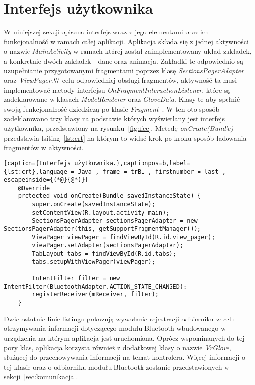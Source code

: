 \section{Interfejs użytkownika}
\label{sec:interface}
W niniejszej sekcji opisano interfejs wraz z jego elementami oraz ich funkcjonalność w ramach całej aplikacji. Aplikacja składa się z jednej aktywności o nazwie \textit{MainActivity} w ramach której został zaimplementowany układ zakładek, a konkretnie dwóch zakładek - dane oraz animacja. Zakładki te odpowiednio są uzupełnianie przygotowanymi fragmentami poprzez klasę \textit{SectionsPagerAdapter} oraz \textit{ViewPager}.W celu odpowiedniej obsługi fragmentów, aktywność ta musi implementować metody interfejsu \textit{OnFragmentInteractionListener}, które są zadeklarowane w klasach \textit{ModelRenderer} oraz \textit{GloveData}. Klasy te aby spełnić swoją funkcjonalność dziedziczą po klasie \textit{Fragment}~\cite{AndroidDoc}. W ten oto sposób zadeklarowano trzy klasy na podstawie których wyświetlany jest interfejs użytkownika, przedstawiony na rysunku~\ref{fig:ifce}. Metodę \textit{onCreate(Bundle)} przedstawia lsiting~\ref{lst:crt} na którym to widać krok po kroku sposób ładowania fragmentów w aktywności.
\begin{lstlisting}[caption={Interfejs użytkownika.},captionpos=b,label={lst:crt},language = Java , frame = trBL , firstnumber = last , escapeinside={(*@}{@*)}]
    @Override
    protected void onCreate(Bundle savedInstanceState) {
        super.onCreate(savedInstanceState);
        setContentView(R.layout.activity_main);
        SectionsPagerAdapter sectionsPagerAdapter = new SectionsPagerAdapter(this, getSupportFragmentManager());
        ViewPager viewPager = findViewById(R.id.view_pager);
        viewPager.setAdapter(sectionsPagerAdapter);
        TabLayout tabs = findViewById(R.id.tabs);
        tabs.setupWithViewPager(viewPager);

        IntentFilter filter = new IntentFilter(BluetoothAdapter.ACTION_STATE_CHANGED);
        registerReceiver(mReceiver, filter);
    }
\end{lstlisting}
Dwie ostatnie linie listingu pokazują wywołanie rejestracji odbiornika w celu otrzymywania informacji dotyczącego modułu Bluetooth wbudowanego w urządzenia na którym aplikacja jest uruchomiona. Oprócz wspominanych do tej pory klas, aplikacja korzysta również z dodatkowej klasy o nazwie \textit{VrGlove}, służącej do przechowywania informacji na temat kontrolera. Więcej informacji o tej klasie oraz o odbiorniku modułu Bluetooth zostanie przedstawionych w sekcji~\ref{sec:komunikacja}. 

